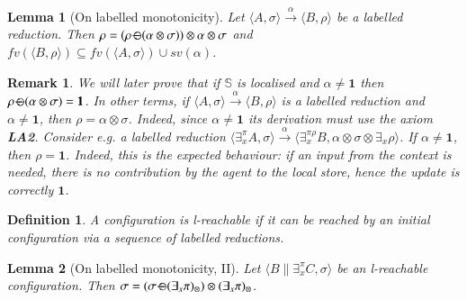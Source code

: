 \documentclass[preprint,12pt]{elsarticle}
\newtheorem{definition}{Definition}
\newtheorem{remark}{Remark}
\newtheorem{lemma}{Lemma}
\def\monid{{\mathbf 0}}
\def\odiv{\, {\ominus\hspace{-7.7pt} \div} \,}
\def\monid{\mathbf{1}}
\begin{document}
\begin{lemma}[On labelled monotonicity]
	\label{l-mono}
	Let $\langle A, \sigma \rangle \xrightarrow{\alpha} \langle B, \rho \rangle$ be a labelled reduction. 
	Then 
	$\rho = (\rho \odiv (\alpha \otimes \sigma)) \otimes \alpha \otimes \sigma$ and 
	$fv(\langle B, \rho \rangle) \subseteq fv(\langle A, \sigma \rangle) \cup sv(\alpha)$.
\end{lemma}


\begin{remark}
	We will later prove that if $\mathbb S$ is localised and $\alpha \neq \monid$ then 
	$\rho \odiv (\alpha \otimes \sigma) = \monid$.
	In other terms, if $\langle A, \sigma \rangle \xrightarrow{\alpha} \langle B, \rho \rangle$ 
	is a labelled reduction and $\alpha \neq \monid$, then $\rho = \alpha \otimes \sigma$.
	Indeed, since $\alpha \neq \monid$ its derivation must use the axiom  {\bf LA2}.
	Consider e.g. a labelled reduction 
	$ \langle \exists^\pi_x A, \sigma \rangle \xrightarrow{\alpha}
	\langle \exists^{\pi \rho}_x B, \alpha \otimes \sigma \otimes \exists_x \rho \rangle$.
	If $\alpha \neq \monid$, then $\rho = \monid$. 
	Indeed, this is the expected behaviour: if an input from the context is needed,
	there is no contribution by the agent to the local store, hence the update is 
	correctly $\monid$.
\end{remark}

\begin{definition}
	A configuration is l-reachable if it can be
	reached by an initial configuration via a sequence of 
	labelled reductions.
\end{definition}


\begin{lemma}[On labelled monotonicity, II]
	\label{l-mono2}
	Let 
	$\langle B \parallel \exists_x^\pi C, \sigma \rangle$ 
	be an l-reachable configuration. 
	Then 
	$\sigma = (\sigma \odiv (\exists_x \pi)_\otimes) \otimes (\exists_x \pi)_\otimes$.
\end{lemma}
\end{document}
